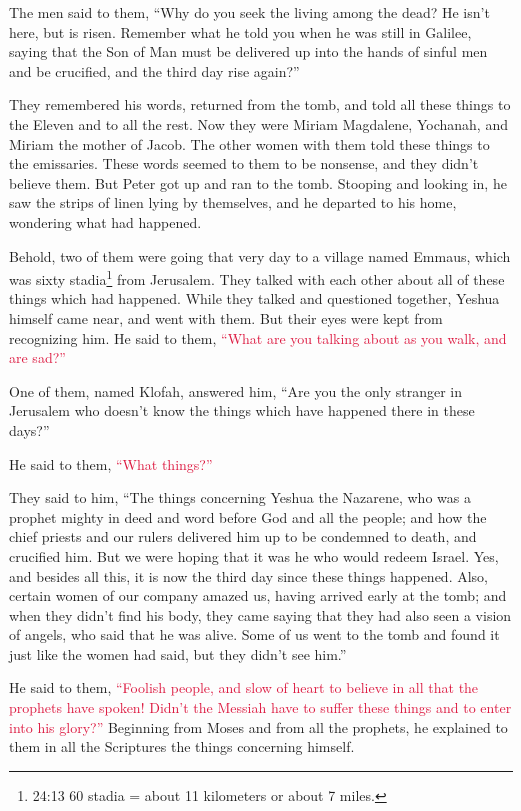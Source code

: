 The men said to them, “Why do you seek the living among the dead?
\myverse{}He isn’t here, but is risen. Remember what he told you when he was still in
Galilee,
\myverse{}saying that the Son of Man must be delivered up into the hands of sinful men
and be crucified, and the third day rise again?”

\myverse{}They remembered his words,
\myverse{}returned from the tomb, and told all these things to the Eleven and to all
the rest.
\myverse{}Now they were Miriam Magdalene, Yochanah, and Miriam the mother of Jacob.
The other women with them told these things to the emissaries.
\myverse{}These words seemed to them to be nonsense, and they didn’t believe them.
\myverse{}But Peter got up and ran to the tomb. Stooping and looking in, he saw the
strips of linen lying by themselves, and he departed to his home, wondering what had happened.

\myverse{}Behold, two of them were going that very day to a village named
Emmaus, which was sixty stadia\footnote{24:13 60 stadia = about 11 kilometers or about 7 miles.
} from Jerusalem.
\myverse{}They talked with each other about all of these things which had happened.
\myverse{}While they talked and questioned together, Yeshua himself came near, and
went with them.
\myverse{}But their eyes were kept from recognizing him.
\myverse{}He said to them,
\textcolor{crimson}{“What are you talking about as you walk, and are sad?”}

\myverse{}One of them, named Klofah, answered him, “Are you the only stranger
in Jerusalem who doesn’t know the things which have happened there in these days?”

\myverse{}He said to them,
\textcolor{crimson}{“What things?”}

They said to him, “The things concerning Yeshua the Nazarene, who was a prophet mighty in
deed and word before God and all the people;
\myverse{}and how the chief priests and our rulers delivered him up to be condemned
to death, and crucified him.
\myverse{}But we were hoping that it was he who would redeem Israel. Yes, and besides
all this, it is now the third day since these things happened.
\myverse{}Also, certain women of our company amazed us, having arrived early at the
tomb;
\myverse{}and when they didn’t find his body, they came saying that they had also seen
a vision of angels, who said that he was alive.
\myverse{}Some of us went to the tomb and found it just like the women had said, but
they didn’t see him.”

\myverse{}He said to them,
\textcolor{crimson}{“Foolish people, and slow of heart to believe in all that the prophets have spoken!
}
\myverse{}\textcolor{crimson}{Didn’t the Messiah have to suffer these things and to enter into his
	glory?”}
\myverse{}Beginning from Moses and from all the prophets, he explained to them in all
the Scriptures the things concerning himself.

